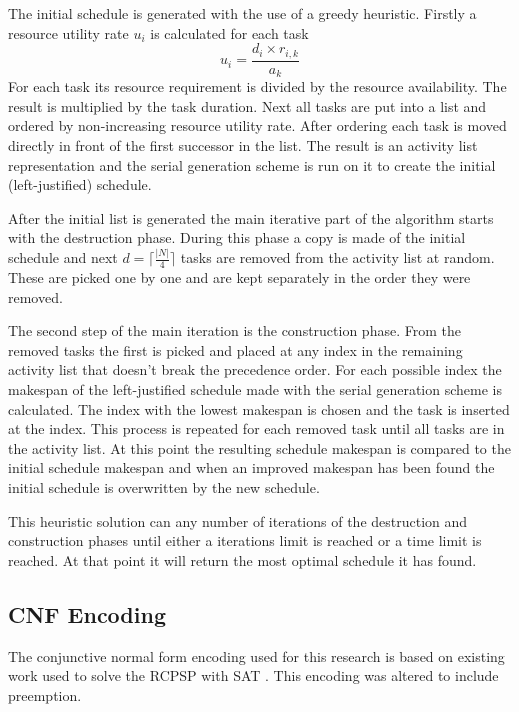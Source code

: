 The initial schedule is generated with the use of a greedy heuristic. Firstly a resource utility rate \(u_i\) is calculated for each task 
\begin{equation}
u_i=\frac{d_i \times r_{i,k}}{a_k} 
\end{equation}
For each task its resource requirement is divided by the resource availability. The result is multiplied by the task duration. Next all tasks are put into a list and ordered by non-increasing resource utility rate. After ordering each task is moved directly in front of the first successor in the list. The result is an activity list representation and the serial generation scheme is run on it to create the initial (left-justified) schedule.

After the initial list is generated the main iterative part of the algorithm starts with the destruction phase. During this phase a copy is made of the initial schedule and next \(d=\lceil\frac{|N|}{4}\rceil\)  tasks are removed from the activity list at random. These are picked one by one and are kept separately in the order they were removed.

The second step of the main iteration is the construction phase. From the removed tasks the first is picked and placed at any index in the remaining activity list that doesn't break the precedence order. For each possible index the makespan of the left-justified schedule made with the serial generation scheme is calculated. The index with the lowest makespan is chosen and the task is inserted at the index. This process is repeated for each removed task until all tasks are in the activity list. At this point the resulting schedule makespan is compared to the initial schedule makespan and when an improved makespan has been found the initial schedule is overwritten by the new schedule.

This heuristic solution can any number of iterations of the destruction and construction phases until either a iterations limit is reached or a time limit is reached. At that point it will return the most optimal schedule it has found.


\subsection{CNF Encoding}
The conjunctive normal form encoding used for this research is based on existing work used to solve the RCPSP with SAT \cite{RN17}. This encoding was altered to include preemption.

